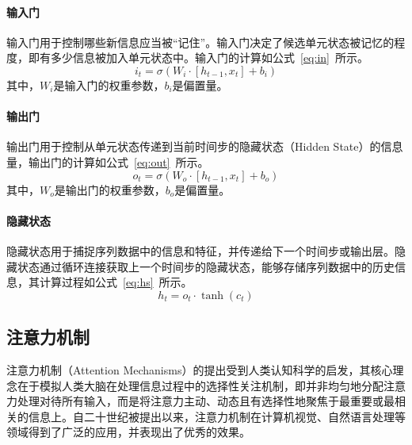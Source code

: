 \paragraph{输入门}

输入门用于控制哪些新信息应当被“记住”。输入门决定了候选单元状态被记忆的程度，即有多少信息被加入单元状态中。输入门的计算如公式~\ref{eq:in}~所示。
\begin{equation}
    i_t = \sigma(W_i \cdot [h_{t-1}, x_t] + b_i)
    \label{eq:in}
\end{equation}
其中，\(W_i\)是输入门的权重参数，\(b_i\)是偏置量。

\paragraph{输出门}

输出门用于控制从单元状态传递到当前时间步的隐藏状态（Hidden State）的信息量，输出门的计算如公式~\ref{eq:out}~所示。
\begin{equation}
    o_t = \sigma(W_o \cdot [h_{t-1}, x_t] + b_o)
    \label{eq:out}
\end{equation}
其中，\(W_o\)是输出门的权重参数，\(b_o\)是偏置量。

\paragraph{隐藏状态}

隐藏状态用于捕捉序列数据中的信息和特征，并传递给下一个时间步或输出层。隐藏状态通过循环连接获取上一个时间步的隐藏状态，能够存储序列数据中的历史信息，其计算过程如公式~\ref{eq:hs}~所示。
\begin{equation}
    h_t = o_t \cdot \tanh(c_t)
    \label{eq:hs}
\end{equation}

\subsection{注意力机制}

注意力机制（Attention Mechanisms）的提出受到人类认知科学的启发，其核心理念在于模拟人类大脑在处理信息过程中的选择性关注机制，即并非均匀地分配注意力处理对待所有输入，而是将注意力主动、动态且有选择性地聚焦于最重要或最相关的信息上。自二十世纪被提出以来\cite{730558}，注意力机制在计算机视觉、自然语言处理等领域得到了广泛的应用，并表现出了优秀的效果。

